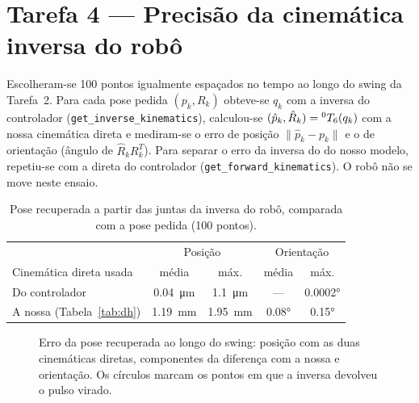 \section{Tarefa 4 --- Precisão da cinemática inversa do robô}
\label{sec:ik}

Escolheram-se 100 pontos igualmente espaçados no tempo ao longo do swing da
Tarefa~2. Para cada pose pedida $(p_k, R_k)$ obteve-se $q_k$ com a inversa do
controlador (\texttt{get\_inverse\_kinematics}), calculou-se
$(\hat p_k, \hat R_k) = {}^{0}T_{6}(q_k)$ com a nossa cinemática direta e
mediram-se o erro de posição $\lVert\hat p_k - p_k\rVert$ e o de orientação
(ângulo de $\hat R_k R_k^{T}$). Para separar o erro da inversa do do nosso
modelo, repetiu-se com a direta do controlador
(\texttt{get\_forward\_kinematics}). O robô não se move neste ensaio.

\begin{table}[H]
\centering
\caption{Pose recuperada a partir das juntas da inversa do robô, comparada com
a pose pedida (100 pontos).}
\label{tab:ik}
\small
\begin{tabular}{lcccc}
\toprule
\rowcolor{tabcab}
 & \multicolumn{2}{c}{Posição} & \multicolumn{2}{c}{Orientação} \\
\rowcolor{tabcab}
Cinemática direta usada & média & máx. & média & máx. \\
\midrule
Do controlador & \SI{0.04}{\micro\meter} & \SI{1.1}{\micro\meter} & --- & \ang{0.0002} \\
A nossa (Tabela~\ref{tab:dh}) & \SI{1.19}{\milli\meter} & \SI{1.95}{\milli\meter} & \ang{0.08} & \ang{0.15} \\
\bottomrule
\end{tabular}
\end{table}

\begin{figure}[H]
\centering
\begin{minipage}[c]{0.55\textwidth}
\centering
{}
\end{minipage}\hfill
\begin{minipage}[c]{0.42\textwidth}
\caption{Erro da pose recuperada ao longo do swing: posição com as duas
cinemáticas diretas, componentes da diferença com a nossa e orientação. Os
círculos marcam os pontos em que a inversa devolveu o pulso virado.}
\label{fig:ik}
\end{minipage}
\end{figure}

